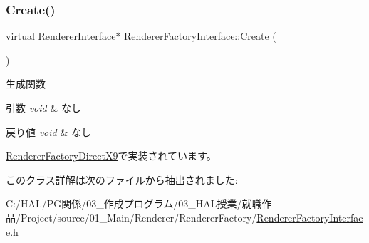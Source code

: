 \subsubsection{\texorpdfstring{Create()}{Create()}}
{\footnotesize\ttfamily virtual \mbox{\hyperlink{class_renderer_interface}{Renderer\+Interface}}$\ast$ Renderer\+Factory\+Interface\+::\+Create (\begin{DoxyParamCaption}{ }\end{DoxyParamCaption})\hspace{0.3cm}{\ttfamily [pure virtual]}}



生成関数 


\begin{DoxyParams}{引数}
{\em void} & なし \\
\hline
\end{DoxyParams}

\begin{DoxyRetVals}{戻り値}
{\em void} & なし \\
\hline
\end{DoxyRetVals}


\mbox{\hyperlink{class_renderer_factory_direct_x9_aa64ac54f3efe121f531a28dd3b7690e3}{Renderer\+Factory\+Direct\+X9}}で実装されています。



このクラス詳解は次のファイルから抽出されました\+:\begin{DoxyCompactItemize}
\item 
C\+:/\+H\+A\+L/\+P\+G関係/03\+\_\+作成プログラム/03\+\_\+\+H\+A\+L授業/就職作品/\+Project/source/01\+\_\+\+Main/\+Renderer/\+Renderer\+Factory/\mbox{\hyperlink{_renderer_factory_interface_8h}{Renderer\+Factory\+Interface.\+h}}\end{DoxyCompactItemize}
